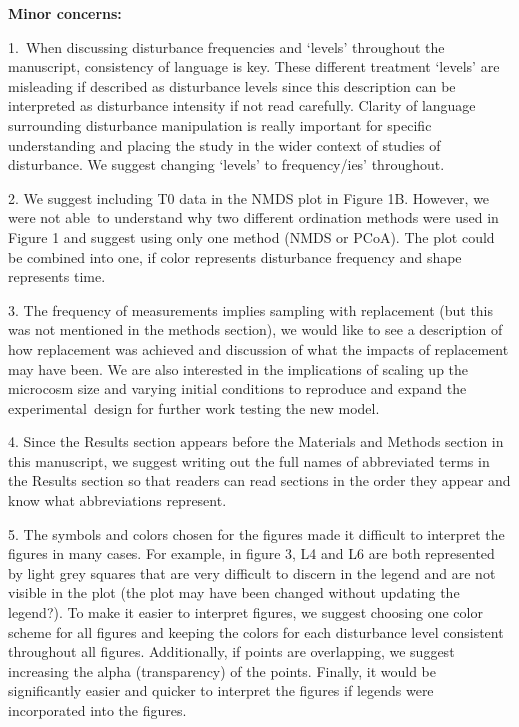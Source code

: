 \documentclass[10pt]{article}
\begin{document}
\textbf{Minor concerns:}

\par\null

1.~When discussing disturbance frequencies and `levels' throughout the
manuscript, consistency of language is key. These different treatment
`levels' are misleading if described as disturbance levels since this
description can be interpreted as disturbance intensity if not read
carefully. Clarity of language surrounding disturbance manipulation is
really important for specific understanding and placing the study in the
wider context of studies of disturbance. We suggest changing `levels' to
frequency/ies' throughout.~

\par\null

2. We suggest including T0 data in the NMDS plot in Figure 1B. However,
we were not able~to understand why two different ordination methods were
used in Figure 1 and suggest using only one method (NMDS or PCoA). The
plot could be combined into one, if color represents disturbance
frequency and shape represents time.~

\par\null

3. The frequency of measurements implies sampling with replacement (but
this was not mentioned in the methods section), we would like to see a
description of how replacement was achieved and discussion of what the
impacts of replacement may have been. We are also interested in the
implications of scaling up the microcosm size and varying initial
conditions to reproduce and expand the experimental~design for further
work testing the new model.~

\par\null

4. Since the Results section appears before the Materials and Methods
section in this manuscript, we suggest writing out the full names of
abbreviated terms in the Results section so that readers can read
sections in the order they appear and know what abbreviations
represent.~

\par\null

5. The symbols and colors chosen for the figures made it difficult to
interpret the figures in many cases. For example, in figure 3, L4 and L6
are both represented by light grey squares that are very difficult to
discern in the legend and are not visible in the plot (the plot may have
been changed without updating the legend?). To make it easier to
interpret figures, we suggest choosing one color scheme for all figures
and keeping the colors for each disturbance level consistent throughout
all figures. Additionally, if points are overlapping, we suggest
increasing the alpha (transparency) of the points. Finally, it would be
significantly easier and quicker to interpret the figures if legends
were incorporated into the figures.~~
\end{document}
